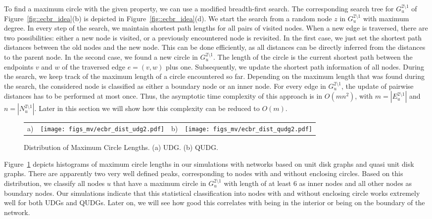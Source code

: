 \documentclass{llncs}
\begin{document}
To find a maximum circle with the given property, we can use a modified breadth-first search.
The corresponding search tree for $G_u^{2\setminus1}$ of Figure~\ref{fig::ecbr_idea}(b) is depicted in Figure~\ref{fig::ecbr_idea}(d).
We start the search from a random node $z$ in $G_u^{2\setminus1}$ with maximum degree.
In every step of the search, we maintain shortest path lengths for all pairs of visited nodes.
When a new edge is traversed, there are two possibilities: either a new node is visited, or a previously encountered node is revisited.
In the first case, we just set the shortest path distances between the old nodes and the new node.
This can be done efficiently, as all distances can be directly inferred from the distances to the parent node.
In the second case, we found a new circle in $G_u^{2\setminus1}$.
The length of the circle is the current shortest path between the endpoints $v$ and $w$ of the traversed edge $e=(v,w)$ plus one.
Subsequently, we update the shortest path information of all nodes.
During the search, we keep track of the maximum length of a circle encountered so far.
Depending on the maximum length that was found during the search, the considered node is classified as either a boundary node or an inner node.
For every edge in $G_u^{2\setminus1}$, the update of pairwise distances has to be performed at most once.
Thus, the asymptotic time complexity of this approach is in $O(m n^2)$, with $m=|E_u^{2\setminus1}|$ and $n=|N_u^{2\setminus1}|$.
Later in this section we will show how this complexity can be reduced to $O(m)$.

\begin{figure}[t]
\centering
\begin{tabular}{llll}
 a) \hspace{0.2cm} &
\parbox[c]{.23\columnwidth}{\texttt{[image: figs\_mv/ecbr\_dist\_udg2.pdf]}} &
\hspace{0.8cm}  b) \hspace{0.2cm} &
\parbox[c]{.23\columnwidth}{\texttt{[image: figs\_mv/ecbr\_dist\_qudg2.pdf]}}
\end{tabular}
\caption{Distribution of Maximum Circle Lengths. (a) UDG. (b) QUDG.}
\label{fig::circle_length}
\end{figure}
Figure~\ref{fig::circle_length} depicts histograms of maximum circle lengths in our simulations with networks based on unit disk graphs and quasi unit disk graphs. There are apparently two very well defined peaks, corresponding to nodes with and without enclosing circles.
Based on this distribution, we classify all nodes $u$ that have a maximum circle in $G_u^{2\setminus1}$ with length of at least $6$ as inner nodes and all other nodes as boundary nodes.
Our simulations indicate that this statistical classification into nodes with and without enclosing circle works extremely well for both UDGs and QUDGs.
Later on, we will see how good this correlates with being in the interior or being on the boundary of the network.
\end{document}
